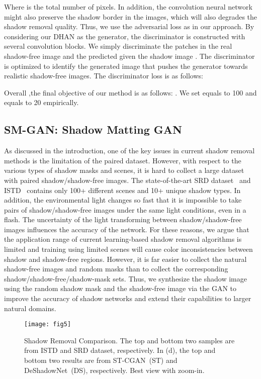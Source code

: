 \documentclass[letterpaper]{article} \usepackage{aaai20}  \usepackage{times}  \usepackage{helvet} \usepackage{courier}  \usepackage[hyphens]{url}  \urlstyle{rm} \def\UrlFont{\rm}  \usepackage{graphicx}  \frenchspacing  \setlength{\pdfpagewidth}{8.5in}  \setlength{\pdfpageheight}{11in}  \usepackage{amssymb}
\begin{document}
Where  is the total number of pixels.
In addition, the convolution neural network might also preserve the shadow border in the images, which will also degrades the shadow removal quality. Thus, we use the adversarial loss as \cite{isola2017image} in our approach. By considering our DHAN as the generator, the discriminator  is constructed with several convolution blocks. We simply discriminate the patches in the real shadow-free image  and the predicted  given the shadow image . The discriminator is optimized to identify the generated image that pushes the generator towards realistic shadow-free images. The discriminator loss is as follows:

Overall ,the final objective of our method  is as follows:
. We set  equals to 100 and  equals to 20 empirically.



\subsection{SM-GAN: Shadow Matting GAN}
 As discussed in the introduction, one of the key issues in current shadow removal methods is the limitation of the paired dataset. However, with respect to the various types of shadow masks and scenes, it is hard to collect a large dataset with paired shadow/shadow-free images. The state-of-the-art SRD dataset~\cite{qu2017deshadownet} and ISTD~\cite{wang2018stacked} contains only 100+ different scenes and 10+ unique shadow types. In addition,
the environmental light changes so fast that it is impossible to take pairs of shadow/shadow-free images under the same light conditions, even in a flash. The uncertainty of the light transforming between shadow/shadow-free images influences the accuracy of the network. For these reasons, we argue that the application range of current learning-based shadow removal algorithms is limited and training using limited scenes will cause color inconsistencies between shadow and shadow-free regions. However, it is far easier to collect the natural shadow-free images and random masks than to collect the corresponding shadow/shadow-free/shadow-mask sets. Thus, we synthesize the shadow image using the random shadow mask and the shadow-free image via the GAN to improve the accuracy of shadow networks and extend their capabilities to larger natural domains. 

\begin{figure*}[t]
\centering     \texttt{[image: fig5]}
\caption{Shadow Removal Comparison. The top and bottom two samples are from ISTD and SRD dataset, respectively. In (d), the top and bottom two results are from ST-CGAN~(ST) and DeShadowNet~(DS), respectively. Best view with zoom-in.}
\label{fig:srd}
\end{figure*}
\end{document}
